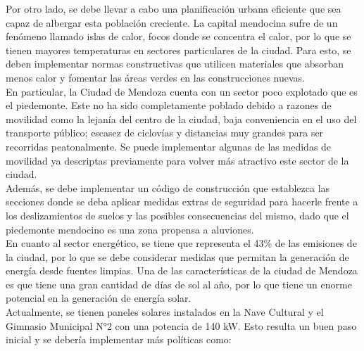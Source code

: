 \documentclass[runningheads]{llncs}
\begin{document}
Por otro lado, se debe llevar a cabo una planificación urbana eficiente que sea capaz de albergar esta población creciente. La capital mendocina sufre de un fenómeno llamado islas de calor, focos donde se concentra el calor, por lo que se tienen mayores temperaturas en sectores particulares de la ciudad. Para esto, se deben implementar normas constructivas que utilicen materiales que absorban menos calor y fomentar las áreas verdes en las construcciones nuevas.\\

En particular, la Ciudad de Mendoza cuenta con un sector poco explotado que es el piedemonte. Este no ha sido completamente poblado debido a razones de movilidad como la lejanía del centro de la ciudad, baja conveniencia en el uso del transporte público; escasez de ciclovías y distancias muy grandes para ser recorridas peatonalmente. Se puede implementar algunas de las medidas de movilidad ya descriptas previamente para volver más atractivo este sector de la ciudad.\\

Además, se debe implementar un código de construcción que establezca las secciones donde se deba aplicar medidas extras de seguridad para hacerle frente a los deslizamientos de suelos y las posibles consecuencias del mismo, dado que el piedemonte mendocino es una zona propensa a aluviones.\\

En cuanto al sector energético, se tiene que representa el 43\% de las emisiones de la ciudad, por lo que se debe considerar medidas que permitan la generación de energía desde fuentes limpias. Una de las características de la ciudad de Mendoza es que tiene una gran cantidad de días de sol al año, por lo que tiene un enorme potencial en la generación de energía solar.~\cite{ref_url13}\\

Actualmente, se tienen paneles solares instalados en la Nave Cultural y el Gimnasio Municipal N°2 con una potencia de 140 kW. Esto resulta un buen paso inicial y se debería implementar más políticas como:
\end{document}
